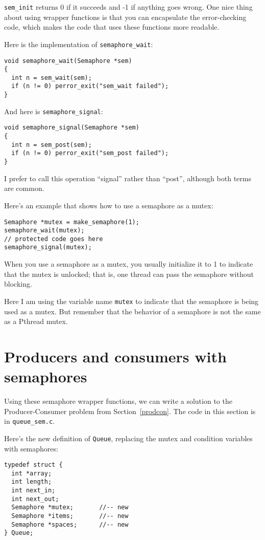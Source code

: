 \documentclass[12pt]{book}
\begin{document}
{\tt sem\_init} returns 0 if it succeeds and -1 if anything goes
wrong.  One nice thing about using wrapper functions is that you can
encapsulate the error-checking code, which makes the code that uses
these functions more readable.

Here is the implementation of \verb"semaphore_wait":

\begin{verbatim}
void semaphore_wait(Semaphore *sem)
{
  int n = sem_wait(sem);
  if (n != 0) perror_exit("sem_wait failed");
}
\end{verbatim}

And here is \verb"semaphore_signal":

\begin{verbatim}
void semaphore_signal(Semaphore *sem)
{
  int n = sem_post(sem);
  if (n != 0) perror_exit("sem_post failed");
}
\end{verbatim}

I prefer to call this operation ``signal'' rather than ``post'',
although both terms are common.

Here's an example that shows how to use a semaphore as a mutex:

\begin{verbatim}
Semaphore *mutex = make_semaphore(1);
semaphore_wait(mutex);
// protected code goes here
semaphore_signal(mutex);
\end{verbatim}

When you use a semaphore as a mutex, you usually
initialize it to 1 to indicate
that the mutex is unlocked; that is, one thread can
pass the semaphore without blocking.

Here I am using the variable name {\tt mutex} to indicate that
the semaphore is being used as a mutex.  But remember that the behavior
of a semaphore is not the same as a Pthread mutex.


\section{Producers and consumers with semaphores}

Using these semaphore wrapper functions, we can
write a solution to the Producer-Consumer problem from
Section~\ref{prodcon}.
The code in this section is in \verb"queue_sem.c".

Here's the new definition of {\tt Queue}, replacing the mutex
and condition variables with semaphores:

\begin{verbatim}
typedef struct {
  int *array;
  int length;
  int next_in;
  int next_out;
  Semaphore *mutex;       //-- new
  Semaphore *items;       //-- new
  Semaphore *spaces;      //-- new
} Queue;
\end{verbatim}
\end{document}
